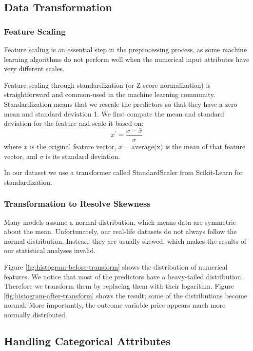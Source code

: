 \subsection{Data Transformation}

\subsubsection*{Feature Scaling}

Feature scaling is an essential step in the preprocessing process, as some
machine learning algorithms do not perform well when the numerical input
attributes have very different scales.

Feature scaling through standardization (or Z-score normalization) is straightforward and
common-used in the machine learning community.
Standardization means that we rescale the predictors so that they have a zero
mean and standard deviation 1.  We first compute the mean and standard deviation
for the feature and scale it based on:
\[x^{'} = \frac{x - \bar{x}}{\sigma}\]
where $x$ is the original feature vector, $\bar{x} = \textrm{average(x)}$ is the mean of
that feature vector, and $\sigma$ is its standard deviation.

\noindent In our dataset we use  a transformer called StandardScaler from Scikit-Learn for
standardization.

\subsubsection*{Transformation to Resolve Skewness}

Many models assume a normal distribution, which means data are symmetric about
the mean.
Unfortunately, our real-life datasets do not always follow the normal
distribution.  Instead, they are usually skewed, which makes the results of our
statistical analyses invalid.

Figure \ref{fig:histogram-before-transform}
shows the distribution of numerical features. We notice
that most of the predictors have a heavy-tailed distribution. Therefore we
transform them by replacing them with their logarithm. Figure
\ref{fig:histogram-after-transform} shows the result;
some of the distributions become normal. More importantly, the outcome variable
price appears much more normally distributed.

\subsection{Handling Categorical Attributes}

